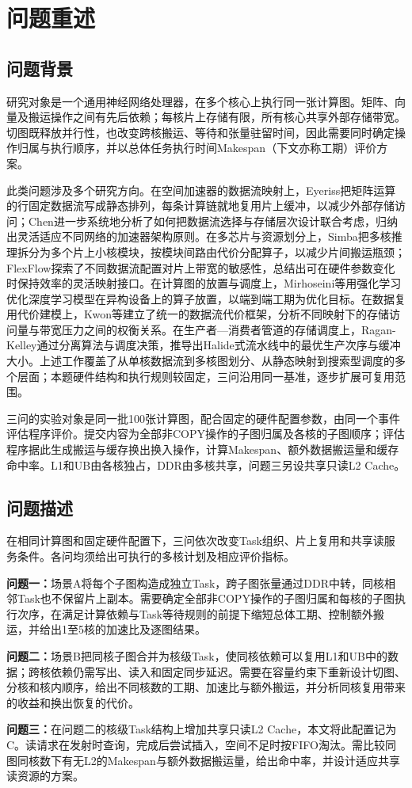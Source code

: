 \section{问题重述}
\subsection{问题背景}
研究对象是一个通用神经网络处理器，在多个核心上执行同一张计算图。矩阵、向量及搬运操作之间有先后依赖；每核片上存储有限，所有核心共享外部存储带宽。切图既释放并行性，也改变跨核搬运、等待和张量驻留时间，因此需要同时确定操作归属与执行顺序，并以总体任务执行时间Makespan（下文亦称工期）评价方案。

此类问题涉及多个研究方向。在空间加速器的数据流映射上，Eyeriss把矩阵运算的行固定数据流写成静态排列，每条计算链就地复用片上缓冲，以减少外部存储访问\cite{chen2016eyeriss}；Chen进一步系统地分析了如何把数据流选择与存储层次设计联合考虑，归纳出灵活适应不同网络的加速器架构原则\cite{chen2018phd}。在多芯片与资源划分上，Simba把多核推理拆分为多个片上小核模块，按模块间路由代价分配算子，以减少片间搬运瓶颈\cite{shao2019simba}；FlexFlow探索了不同数据流配置对片上带宽的敏感性，总结出可在硬件参数变化时保持效率的灵活映射接口\cite{lu2017flexflow}。在计算图的放置与调度上，Mirhoseini等用强化学习优化深度学习模型在异构设备上的算子放置，以端到端工期为优化目标\cite{mirhoseini2017placement}。在数据复用代价建模上，Kwon等建立了统一的数据流代价框架，分析不同映射下的存储访问量与带宽压力之间的权衡关系\cite{kwon2019dataflow}。在生产者—消费者管道的存储调度上，Ragan-Kelley通过分离算法与调度决策，推导出Halide式流水线中的最优生产次序与缓冲大小\cite{ragankelley2014phd}。上述工作覆盖了从单核数据流到多核图划分、从静态映射到搜索型调度的多个层面；本题硬件结构和执行规则较固定，三问沿用同一基准，逐步扩展可复用范围。

三问的实验对象是同一批100张计算图，配合固定的硬件配置参数，由同一个事件评估程序评价。提交内容为全部非COPY操作的子图归属及各核的子图顺序；评估程序据此生成搬运与缓存换出换入操作，计算Makespan、额外数据搬运量和缓存命中率。L1和UB由各核独占，DDR由多核共享，问题三另设共享只读L2 Cache。

\subsection{问题描述}
在相同计算图和固定硬件配置下，三问依次改变Task组织、片上复用和共享读服务条件。各问均须给出可执行的多核计划及相应评价指标。

\textbf{问题一：}场景A将每个子图构造成独立Task，跨子图张量通过DDR中转，同核相邻Task也不保留片上副本。需要确定全部非COPY操作的子图归属和每核的子图执行次序，在满足计算依赖与Task等待规则的前提下缩短总体工期、控制额外搬运，并给出1至5核的加速比及逐图结果。

\textbf{问题二：}场景B把同核子图合并为核级Task，使同核依赖可以复用L1和UB中的数据；跨核依赖仍需写出、读入和固定同步延迟。需要在容量约束下重新设计切图、分核和核内顺序，给出不同核数的工期、加速比与额外搬运，并分析同核复用带来的收益和换出恢复的代价。

\textbf{问题三：}在问题二的核级Task结构上增加共享只读L2 Cache，本文将此配置记为C。读请求在发射时查询，完成后尝试插入，空间不足时按FIFO淘汰。需比较同图同核数下有无L2的Makespan与额外数据搬运量，给出命中率，并设计适应共享读资源的方案。
